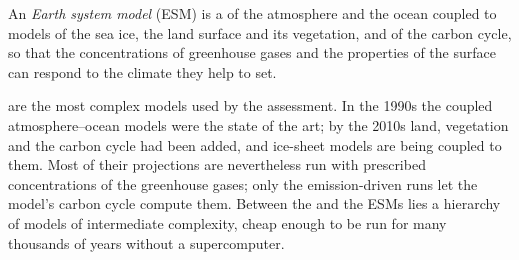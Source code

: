 \begin{omfigure}
\par{}\label{fig:b3:climate-models:grid}
\end{omfigure}

\begin{definition}\label{def:b3:climate-models:esm}
An \emph{Earth system model} (ESM) is a  of the atmosphere and the ocean coupled to models of the
sea ice, the land surface and its vegetation, and of the carbon cycle, so
that the concentrations of greenhouse gases and the properties of the
surface can respond to the climate they help to set.
\end{definition}

 are the most complex models used by the assessment. In
the 1990s the coupled atmosphere--ocean models were the state of the art;
by the 2010s land, vegetation and the carbon cycle had been added, and
ice-sheet models are being coupled to them. Most of their projections are
nevertheless run with prescribed concentrations of the greenhouse gases;
only the emission-driven runs let the model's carbon cycle compute them.
Between the  and the ESMs lies a hierarchy of models
of intermediate complexity, cheap enough to be run for many thousands of
years without a supercomputer.

